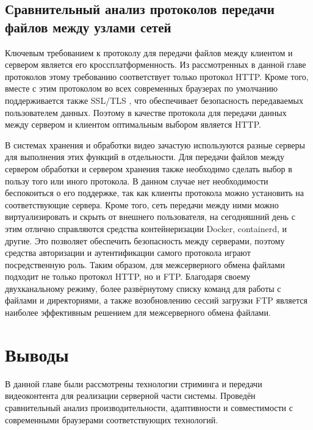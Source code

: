 \subsection{Сравнительный анализ протоколов передачи файлов между узлами сетей}	
	Ключевым требованием к протоколу для передачи файлов между клиентом и сервером является его кроссплатформенность. Из рассмотренных в данной главе протоколов этому требованию соответствует только протокол HTTP. Кроме того, вместе с этим протоколом во всех современных браузерах по умолчанию поддерживается также SSL/TLS \cite{rfcHttp10}, что обеспечивает безопасность передаваемых пользователем данных. Поэтому в качестве протокола для передачи данных между сервером и клиентом оптимальным выбором является HTTP.
	
	В системах хранения и обработки видео зачастую используются разные серверы для выполнения этих функций в отдельности. Для передачи файлов между сервером обработки и сервером хранения также необходимо сделать выбор в пользу того или иного протокола. В данном случае нет необходимости беспокоиться о его поддержке, так как клиенты протокола можно установить на соответствующие сервера. Кроме того, сеть передачи между ними можно виртуализировать и скрыть от внешнего пользователя, на сегодняшний день с этим отлично справляются средства контейнеризации Docker, containerd, и другие. Это позволяет обеспечить безопасность между серверами, поэтому средства авторизации и аутентификации самого протокола играют посредственную роль. Таким образом, для межсерверного обмена файлами подходит не только протокол HTTP, но и FTP. Благодаря своему двухканальному режиму, более развёрнутому списку команд для работы с файлами и директориями, а также возобновлению сессий загрузки FTP является наиболее эффективным решением для межсерверного обмена файлами.

\section{Выводы}
	В данной главе были рассмотрены технологии стриминга  и передачи видеоконтента для реализации серверной части системы. Проведён сравнительный анализ производительности, адаптивности и совместимости с современными браузерами соответствующих технологий.


